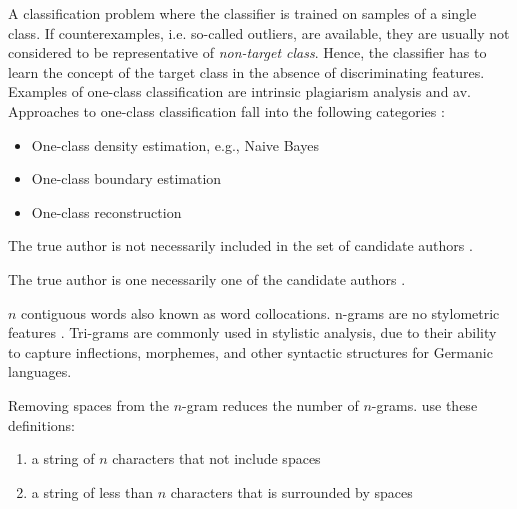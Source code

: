 \begin{definition}
    A classification problem where the classifier is trained on samples of a single class.
    If counterexamples, i.e. so-called outliers, are available, they are usually not considered to be representative of \textit{non-target class}.
    Hence, the classifier has to learn the concept of the target class in the absence of discriminating features.
    Examples of one-class classification are intrinsic plagiarism analysis and \ac{av}.
    Approaches to one-class classification fall into the following categories \cite{stein_intrinsic_2011}:
    \begin{itemize}
        \item One-class density estimation, e.g., Naive Bayes
        \item One-class boundary estimation
        \item One-class reconstruction
    \end{itemize}
\end{definition}

\begin{definition}
    The true author is not necessarily included in the set of candidate authors \cite{stamatatos_survey_2009,barlas_cross_domain_2020}.
\end{definition}

\begin{definition}
    The true author is one necessarily one of the candidate authors \cite{stamatatos_survey_2009,koppel_authorship_2011,barlas_cross_domain_2020}.
\end{definition}

\begin{definition}
    [n-gram]
    $n$ contiguous words also known as word collocations. 
    n-grams are no stylometric features \cite{altakrori_topic_2021}.
    Tri-grams are commonly used in stylistic analysis, due to their ability to capture inflections, %
    morphemes, %
    and other syntactic structures for Germanic languages.

\end{definition}

\begin{definition}
    Removing spaces from the $n$-gram reduces the number of $n$-grams.
    \citet{koppel_authorship_2011} use these definitions:
    \begin{enumerate}
        \item a string of $n$ characters that not include spaces
        \item a string of less than $n$ characters that is surrounded by spaces
    \end{enumerate}
\end{definition}

